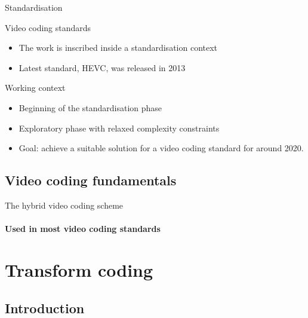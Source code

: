 \documentclass[10pt]{beamer} %
\begin{document}
\begin{frame}{Standardisation}
	\begin{block}{Video coding standards}
		\begin{itemize}
			\item The work is inscribed inside a standardisation context
			\item Latest standard, HEVC, was released in 2013
		\end{itemize}
	\end{block}
	\begin{block}{Working context}
		\begin{itemize}
			\item Beginning of the standardisation phase
			\item Exploratory phase with relaxed complexity constraints
			\item Goal: achieve a suitable solution for a video coding
				standard for around 2020.
		\end{itemize}
	\end{block}
	\centering
	
\end{frame}

\subsection{Video coding fundamentals}

\begin{frame}{The hybrid video coding scheme}
	\framesubtitle{Used in most video coding standards}
\end{frame}

\section{Transform coding}

\subsection{Introduction}
\end{document}
